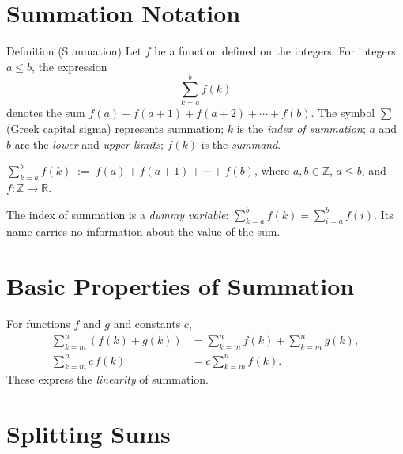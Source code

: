 
\section{Summation Notation}

\begin{definitionbox}{Definition (Summation)}
Let \(f\) be a function defined on the integers.
For integers \(a \le b\), the expression
\[
\sum_{k=a}^{b} f(k)
\]
denotes the sum \(f(a) + f(a+1) + f(a+2) + \cdots + f(b)\).
The symbol \(\sum\) (Greek capital sigma) represents summation;
\(k\) is the \emph{index of summation}; \(a\) and \(b\) are the
\emph{lower} and \emph{upper limits}; \(f(k)\) is the \emph{summand}.
\end{definitionbox}
\label{def:summation}

\begin{remark*}
\(\displaystyle\sum_{k=a}^{b} f(k) \;:=\; f(a) + f(a+1) + \cdots + f(b)\),
where \(a,b \in \mathbb{Z}\), \(a \le b\), and \(f : \mathbb{Z}\to\mathbb{R}\).
\end{remark*}

\begin{remark*}
The index of summation is a \emph{dummy variable}:
\(\displaystyle\sum_{k=a}^{b} f(k) = \sum_{i=a}^{b} f(i)\).
Its name carries no information about the value of the sum.
\end{remark*}

\section*{Basic Properties of Summation}

\begin{remark*}
For functions \(f\) and \(g\) and constants \(c\),
\begin{align*}
\sum_{k=m}^{n} (f(k) + g(k))
&=
\sum_{k=m}^{n} f(k)
+
\sum_{k=m}^{n} g(k), \\[6pt]
\sum_{k=m}^{n} c\,f(k)
&=
c \sum_{k=m}^{n} f(k).
\end{align*}
These express the \emph{linearity} of summation.
\end{remark*}

\section*{Splitting Sums}

